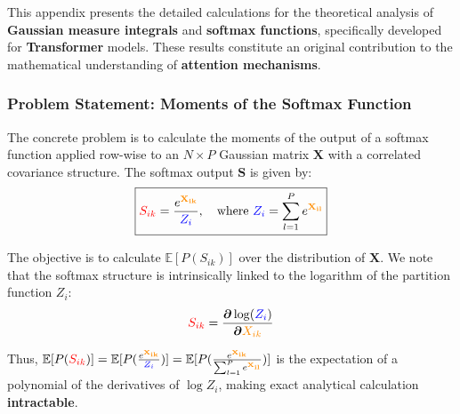 \documentclass[a4paper]{article}
\theoremstyle{plain}
\theoremstyle{definition}
\theoremstyle{remark}
\begin{document}
\begin{tcolorbox}[colback=personalcontribcolor!15,colframe=personalcontribcolor!80!black,title={\textbf{Major Personal Contribution}},enhanced,drop shadow,boxrule=2pt]
This appendix presents the detailed calculations for the theoretical analysis of \textcolor{insightcolor}{\textbf{Gaussian measure integrals}} and \textcolor{methodcolor}{\textbf{softmax functions}}, specifically developed for \textcolor{kernelcolor}{\textbf{Transformer}} models. These results constitute an original contribution to the mathematical understanding of \textcolor{k3color}{\textbf{attention mechanisms}}.
\end{tcolorbox}



\subsubsection{Problem Statement: Moments of the Softmax Function}

The concrete problem is to calculate the moments of the output of a softmax function applied row-wise to an $N \times P$ Gaussian matrix $\mathbf{X}$ with a correlated covariance structure. The softmax output $\mathbf{S}$ is given by:
\begin{equation}
\boxed{ \textcolor{red}{S_{ik}} = \frac{e^{\textcolor{insightcolor}{\mathbf{X_{ik}}}}}{\textcolor{blue}{Z_i}}, \quad \text{where } \textcolor{blue}{Z_i} = \sum_{l=1}^{P} e^{\textcolor{insightcolor}{\mathbf{X_{il}}}}}
\end{equation}

The objective is to calculate $\mathbb{E}[P(S_{ik})]$ over the distribution of $\mathbf{X}$. We note that the softmax structure is intrinsically linked to the logarithm of the partition function $Z_i$:
\begin{equation}
\textcolor{red}{S_{ik}} = \frac{\boldsymbol{\partial} \log(\textcolor{blue}{Z_i})}{\boldsymbol{\partial} \textcolor{insightcolor}{X_{ik}}}
\end{equation}

Thus, $\mathbb{E}[P( \textcolor{red}{S_{ik}})] = \mathbb{E}[P( \frac{e^{\textcolor{insightcolor}{\mathbf{X_{ik}}}}}{\textcolor{blue}{Z_i}})] = \mathbb{E}[P( \frac{e^{\textcolor{insightcolor}{\mathbf{X_{ik}}}}}{\sum_{l=1}^{P} e^{\textcolor{insightcolor}{\mathbf{X_{il}}}}})]$ is the expectation of a polynomial of the derivatives of $\log Z_i$, making exact analytical calculation \textbf{intractable}.
\end{document}
